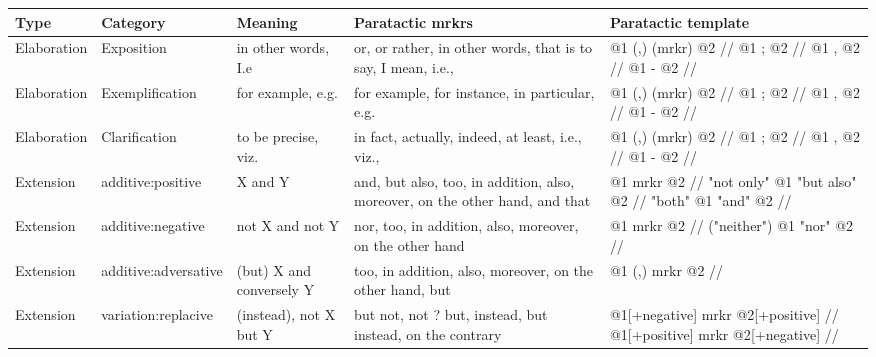 	\clearpage%
	\begin{landscape}%
		\centering %
		\begin{longtable}{|l|l|p{3cm}|p{5cm}|p{5cm}|}
			\hline
			{\bf Type}  & {\bf Category}         & {\bf Meaning}                        & {\bf Paratactic mrkrs}                                                                 & {\bf Paratactic template}                                                               \\ \hline
			Elaboration & Exposition             & in other words, I.e                  & or, or rather, in other words, that is to say, I mean, i.e.,                           & @1 (,) (mrkr) @2 // @1 ;  @2 // @1 , @2 // @1 - @2 //                                   \\ \hline
			Elaboration & Exemplification        & for example, e.g.                    & for example, for instance, in particular, e.g.                                         & @1 (,) (mrkr) @2 // @1 ;  @2 // @1 , @2 // @1 - @2 //                                   \\ \hline
			Elaboration & Clarification          & to be precise, viz.                  & in fact, actually, indeed, at least, i.e., viz.,                                       & @1 (,) (mrkr) @2 // @1 ;  @2 // @1 , @2 // @1 - @2 //                                   \\ \hline
			Extension   & additive:positive      & X and Y                              & and, but also, too, in addition, also, moreover, on the other hand, and that           & @1 mrkr @2 // "not only" @1 "but also" @2 // "both" @1 "and" @2 //                      \\ \hline
			Extension   & additive:negative      & not X and not Y                      & nor, too, in addition, also, moreover, on the other hand                               & @1 mrkr @2 // ("neither") @1 "nor" @2 //                                                \\ \hline
			Extension   & additive:adversative   & (but) X and conversely Y             & too, in addition, also, moreover, on the other hand, but                               & @1 (,) mrkr @2 //                                                                       \\ \hline
			Extension   & variation:replacive    & (instead), not X but Y               & but not, not ? but, instead, but instead, on the contrary                              & @1{[}+negative{]} mrkr @2{[}+positive{]} // @1{[}+positive{]} mrkr @2{[}+negative{]} // \\ \hline

\end{longtable}
\end{landscape}
